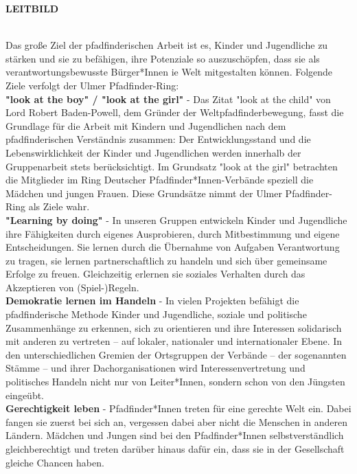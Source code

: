 \begin{Large}
    \textbf{LEITBILD}
\end{Large}
\\

Das große Ziel der pfadfinderischen Arbeit ist es, Kinder und Jugendliche zu stärken und sie zu 
befähigen, ihre Potenziale so auszuschöpfen, dass sie als verantwortungsbewusste Bürger*Innen ie 
Welt mitgestalten können. Folgende Ziele verfolgt der Ulmer Pfadfinder-Ring:
\\

\textbf{"look at the boy" / "look at the girl"} - Das Zitat "look at the child" von Lord Robert 
Baden-Powell, dem Gründer der Weltpfadfinderbewegung, fasst die Grundlage für die Arbeit mit Kindern 
und Jugendlichen nach dem pfadfinderischen Verständnis zusammen: Der Entwicklungsstand und die 
Lebenswirklichkeit der Kinder und Jugendlichen werden innerhalb der Gruppenarbeit stets 
berücksichtigt. Im Grundsatz "look at the girl" betrachten die Mitglieder im Ring Deutscher 
Pfadfinder*Innen-Verbände speziell die Mädchen und jungen Frauen. Diese Grundsätze nimmt der Ulmer
Pfadfinder-Ring als Ziele wahr.
\\

\textbf{"Learning by doing"} - In unseren Gruppen entwickeln Kinder und Jugendliche ihre Fähigkeiten 
durch eigenes Ausprobieren, durch Mitbestimmung und eigene Entscheidungen. Sie lernen durch die 
Übernahme von Aufgaben Verantwortung zu tragen, sie lernen partnerschaftlich zu handeln und sich 
über gemeinsame Erfolge zu freuen. Gleichzeitig erlernen sie soziales Verhalten durch das 
Akzeptieren von (Spiel-)Regeln.
\\

\textbf{Demokratie lernen im Handeln} - In vielen Projekten befähigt die pfadfinderische Methode 
Kinder und Jugendliche, soziale und politische Zusammenhänge zu erkennen, sich zu orientieren und 
ihre Interessen solidarisch mit anderen zu vertreten – auf lokaler, nationaler und internationaler 
Ebene. In den unterschiedlichen Gremien der Ortsgruppen der Verbände – der sogenannten Stämme – und 
ihrer Dachorganisationen wird Interessenvertretung und politisches Handeln nicht nur von 
Leiter*Innen, sondern schon von den Jüngsten eingeübt.
\\

\textbf{Gerechtigkeit leben} - Pfadfinder*Innen treten für eine gerechte Welt ein. Dabei fangen sie 
zuerst bei sich an, vergessen dabei aber nicht die Menschen in anderen Ländern. Mädchen und Jungen 
sind bei den Pfadfinder*Innen selbstverständlich gleichberechtigt und treten darüber hinaus dafür 
ein, dass sie in der Gesellschaft gleiche Chancen haben.
\\

